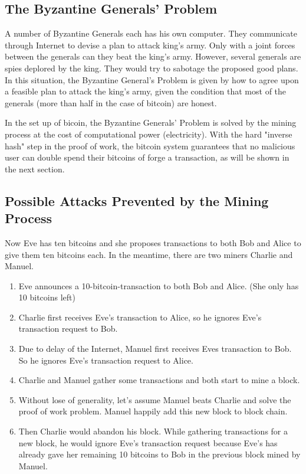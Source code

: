 \documentclass[12pt,a4paper]{article}
\begin{document}
\subsection{The Byzantine Generals' Problem}
A number of Byzantine Generals each has his own computer. They communicate through Internet to devise a plan to attack king's army. Only with a joint forces between the generals can they beat the king's army. However, several generals are spies deplored by the king. They would try to sabotage the proposed good plans. In this situation, the Byzantine General's Problem is given by how to agree upon a feasible plan to attack the king's army, given the condition that most of the generals (more than half in the case of bitcoin) are honest.


In the set up of bicoin, the Byzantine Generals' Problem is solved by the mining process at the cost of computational power (electricity). With the hard "inverse hash" step in the proof of work, the bitcoin system guarantees that no malicious user can double spend their bitcoins of forge a transaction, as will be shown in the next section.
\subsection{Possible Attacks Prevented by the Mining Process} 
Now Eve has ten bitcoins and she proposes transactions to both Bob and Alice to give them ten bitcoins each. In the meantime, there are two miners Charlie and Manuel.
\begin{enumerate}
	\item Eve announces a 10-bitcoin-transaction to  both Bob and Alice. (She only has 10 bitcoins left)
	\item Charlie first receives Eve's transaction to Alice, so he ignores Eve's transaction request to Bob.
	\item Due to delay of the Internet, Manuel first receives Eves transaction to Bob. So he ignores Eve's transaction request to Alice.
	\item Charlie and Manuel gather some transactions and both start to mine a block. 
	\item Without lose of generality, let's assume Manuel beats Charlie and solve the proof of work problem. Manuel happily add this new block to block chain. 
	\item Then Charlie would abandon his block. While gathering transactions for a new block, he would ignore Eve's transaction request because Eve's has already gave her remaining 10 bitcoins to Bob in the previous block mined by Manuel. 
\end{enumerate}
\end{document}
